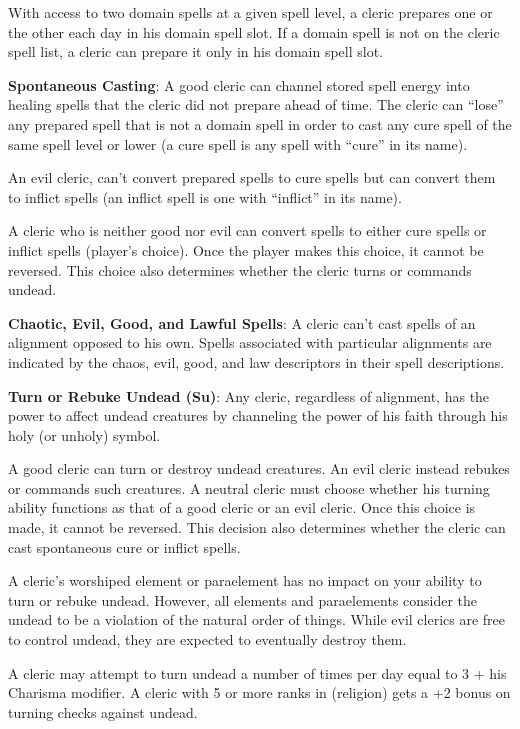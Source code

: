 With access to two domain spells at a given spell level, a cleric prepares one or the other each day in his domain spell slot. If a domain spell is not on the cleric spell list, a cleric can prepare it only in his domain spell slot.

\textbf{Spontaneous Casting}: A good cleric can channel stored spell energy into healing spells that the cleric did not prepare ahead of time. The cleric can ``lose'' any prepared spell that is not a domain spell in order to cast any cure spell of the same spell level or lower (a cure spell is any spell with ``cure'' in its name).

An evil cleric, can't convert prepared spells to cure spells but can convert them to inflict spells (an inflict spell is one with ``inflict'' in its name).

A cleric who is neither good nor evil can convert spells to either cure spells or inflict spells (player's choice). Once the player makes this choice, it cannot be reversed. This choice also determines whether the cleric turns or commands undead.

\textbf{Chaotic, Evil, Good, and Lawful Spells}: A cleric can't cast spells of an alignment opposed to his own. Spells associated with particular alignments are indicated by the chaos, evil, good, and law descriptors in their spell descriptions.

\textbf{Turn or Rebuke Undead (Su)}: Any cleric, regardless of alignment, has the power to affect undead creatures by channeling the power of his faith through his holy (or unholy) symbol.

A good cleric can turn or destroy undead creatures. An evil cleric instead rebukes or commands such creatures. A neutral cleric must choose whether his turning ability functions as that of a good cleric or an evil cleric. Once this choice is made, it cannot be reversed. This decision also determines whether the cleric can cast spontaneous cure or inflict spells.

A cleric's worshiped element or paraelement has no impact on your ability to turn or rebuke undead. However, all elements and paraelements consider the undead to be a violation of the natural order of things. While evil clerics are free to control undead, they are expected to eventually destroy them.

A cleric may attempt to turn undead a number of times per day equal to 3 + his Charisma modifier. A cleric with 5 or more ranks in  (religion) gets a +2 bonus on turning checks against undead.

